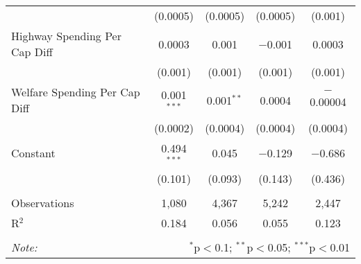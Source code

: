 \begin{table}[!htbp]
\begin{tabular}{@{\extracolsep{5pt}}lcccc}
  & (0.0005) & (0.0005) & (0.0005) & (0.001) \\ 
  Highway Spending Per Cap Diff & 0.0003 & 0.001 & $-$0.001 & 0.0003 \\ 
  & (0.001) & (0.001) & (0.001) & (0.001) \\ 
  Welfare Spending Per Cap Diff & 0.001$^{***}$ & 0.001$^{**}$ & 0.0004 & $-$0.00004 \\ 
  & (0.0002) & (0.0004) & (0.0004) & (0.0004) \\ 
  Constant & 0.494$^{***}$ & 0.045 & $-$0.129 & $-$0.686 \\ 
  & (0.101) & (0.093) & (0.143) & (0.436) \\ 
 \hline \\[-1.8ex] 
Observations & 1,080 & 4,367 & 5,242 & 2,447 \\ 
R$^{2}$ & 0.184 & 0.056 & 0.055 & 0.123 \\ 
\hline 
\hline \\[-1.8ex] 
\textit{Note:}  & \multicolumn{4}{r}{$^{*}$p$<$0.1; $^{**}$p$<$0.05; $^{***}$p$<$0.01} \\ 
\end{tabular} 
\end{table} 
